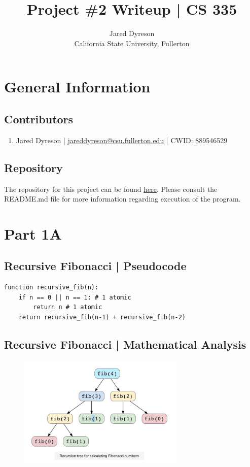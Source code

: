 \documentclass{article}
\title{Project \#2 Writeup | CS 335}
\author{Jared Dyreson\\ 
        California State University, Fullerton}
\begin{document}
\maketitle
\tableofcontents
\newpage

\section{General Information}

\subsection{Contributors}

\begin{enumerate}
\item Jared Dyreson | \href{mailto:jareddyreson@csu.fullerton.edu}{\underline{jareddyreson@csu.fullerton.edu}} | CWID: 889546529
\end{enumerate}

\subsection{Repository}

The repository for this project can be found \href{https://github.com/JaredDyreson/FibblyWhibbly}{\underline{here}}.
Please consult the README.md file for more information regarding execution of the program.

\newpage

\section{Part 1A}

\subsection{Recursive Fibonacci | Pseudocode}

\begin{verbatim}
function recursive_fib(n):
    if n == 0 || n == 1: # 1 atomic
        return n # 1 atomic
    return recursive_fib(n-1) + recursive_fib(n-2)
\end{verbatim}

\subsection{Recursive Fibonacci | Mathematical Analysis}

\begin{figure}[!h]
\centering
\includegraphics[width=8cm]{fibonacci_recursive_tree}
\end{figure}
\end{document}
